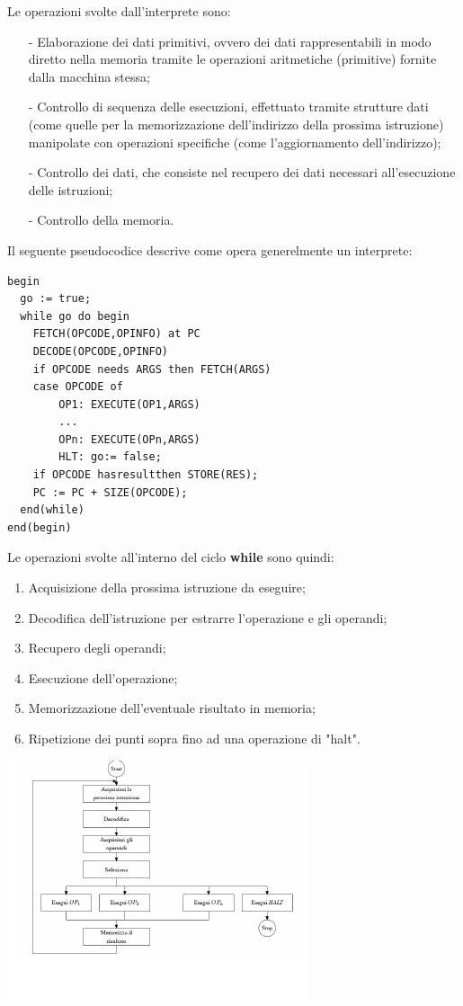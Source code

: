 \documentclass[a4paper, 10pt]{report}
\begin{document}
\begin{itemize}
\noindent Le operazioni svolte dall'interprete sono:
\begin{itemize}
\item[-] Elaborazione dei dati primitivi, ovvero dei dati rappresentabili in modo diretto nella memoria tramite le operazioni aritmetiche (primitive) fornite dalla macchina stessa;
\item[-] Controllo di sequenza delle esecuzioni, effettuato tramite strutture dati (come quelle per la memorizzazione dell'indirizzo della prossima istruzione) manipolate con operazioni specifiche (come l'aggiornamento dell'indirizzo);
\item[-] Controllo dei dati, che consiste nel recupero dei dati necessari all'esecuzione delle istruzioni;
\item[-] Controllo della memoria.
\end{itemize}

\newpage

Il seguente pseudocodice descrive come opera generelmente un interprete:
\lstset{language=Java}
\begin{lstlisting}
begin    
  go := true; 
  while go do begin
	FETCH(OPCODE,OPINFO) at PC 	
	DECODE(OPCODE,OPINFO) 
	if OPCODE needs ARGS then FETCH(ARGS) 
	case OPCODE of 
		OP1: EXECUTE(OP1,ARGS) 
		... 
		OPn: EXECUTE(OPn,ARGS) 
		HLT: go:= false; 
	if OPCODE hasresultthen STORE(RES); 
	PC := PC + SIZE(OPCODE);     
  end(while)
end(begin)
\end{lstlisting}

Le operazioni svolte all'interno del ciclo \textbf{while} sono quindi: 
\begin{enumerate}
\item Acquisizione della prossima istruzione da eseguire;
\item Decodifica dell'istruzione per estrarre l'operazione e gli operandi;
\item Recupero degli operandi;
\item Esecuzione dell'operazione;
\item Memorizzazione dell'eventuale risultato in memoria;
\item Ripetizione dei punti sopra fino ad una operazione di "halt".
\end{enumerate}

\begin{center}
\includegraphics[scale=2.2]{interprete_struttura.pdf}
\end{center}


\end{itemize}
\end{document}
